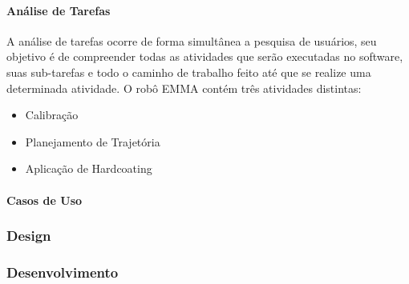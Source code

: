 \paragraph{Análise de Tarefas}
A análise de tarefas ocorre de forma simultânea a pesquisa de usuários, seu
objetivo é de compreender todas as atividades que serão executadas no software,
suas sub-tarefas e todo o caminho de trabalho feito até que se realize
uma determinada atividade. O robô EMMA contém três atividades distintas:

\begin{itemize}
  \item Calibração
  \item Planejamento de Trajetória
  \item Aplicação de Hardcoating
\end{itemize}

\paragraph{Casos de Uso}


\subsubsection{Design}

\subsubsection{Desenvolvimento}





